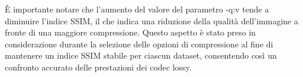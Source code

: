 È importante notare che l'aumento del valore del parametro -q:v tende a diminuire l'indice SSIM, il che indica una riduzione della qualità dell'immagine a fronte di una maggiore compressione. Questo aspetto è stato preso in considerazione durante la selezione delle opzioni di compressione al fine di mantenere un indice SSIM stabile per ciascun dataset, consentendo così un confronto accurato delle prestazioni dei codec lossy.









